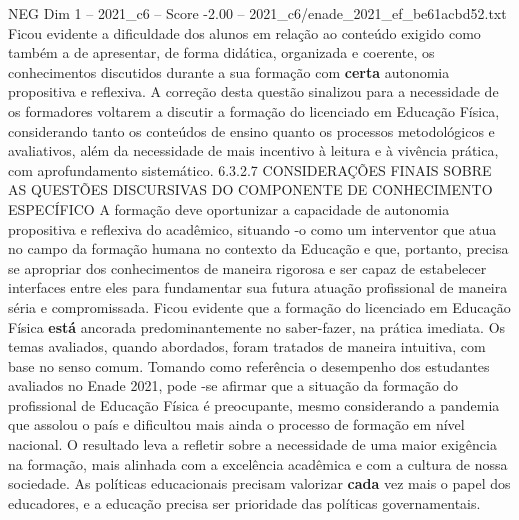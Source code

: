 \begin{textsample}{NEG Dim 1 – 2021\_c6 – Score -2.00 – 2021\_c6/enade\_2021\_ef\_be61acbd52.txt}
Ficou evidente a dificuldade dos alunos em relação ao conteúdo exigido como também a de apresentar, de forma didática, organizada e coerente, os conhecimentos discutidos durante a sua formação com \textbf{certa} autonomia propositiva e reflexiva.
A correção desta questão sinalizou para a necessidade de os formadores voltarem a discutir a formação do licenciado em Educação Física, considerando tanto os conteúdos de ensino quanto os processos metodológicos e avaliativos, além da necessidade de mais incentivo à leitura e à vivência prática, com aprofundamento sistemático. 6.3.2.7 CONSIDERAÇÕES FINAIS SOBRE AS QUESTÕES DISCURSIVAS DO COMPONENTE DE CONHECIMENTO ESPECÍFICO A formação deve oportunizar a capacidade de autonomia propositiva e reflexiva do acadêmico, situando -o como um interventor que atua no campo da formação humana no contexto da Educação e que, portanto, precisa se apropriar dos conhecimentos de maneira rigorosa e ser capaz de estabelecer interfaces entre eles para fundamentar sua futura atuação profissional de maneira séria e compromissada.
Ficou evidente que a formação do licenciado em Educação Física \textbf{está} ancorada predominantemente no saber-fazer, na prática imediata.
Os temas avaliados, quando abordados, foram tratados de maneira intuitiva, com base no senso comum.
Tomando como referência o desempenho dos estudantes avaliados no Enade 2021, pode -se afirmar que a situação da formação do profissional de Educação Física é preocupante, mesmo considerando a pandemia que assolou o país e dificultou mais ainda o processo de formação em nível nacional.
O resultado leva a refletir sobre a necessidade de uma maior exigência na formação, mais alinhada com a excelência acadêmica e com a cultura de nossa sociedade.
As políticas educacionais precisam valorizar \textbf{cada} vez mais o papel dos educadores, e a educação precisa ser prioridade das políticas governamentais.

\end{textsample}
